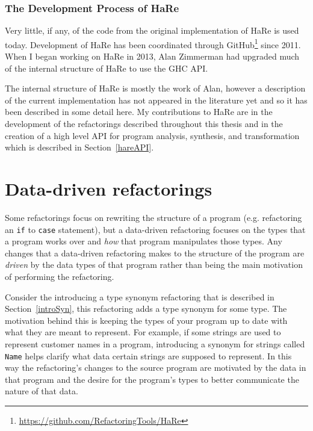 \subsection{The Development Process of HaRe}

Very little, if any, of the code from the original implementation of HaRe is used today. Development of HaRe has been coordinated through GitHub\footnote{\url{https://github.com/RefactoringTools/HaRe}} since 2011. When I began working on HaRe in 2013, Alan Zimmerman had upgraded much of the internal structure of HaRe to use the GHC API. 

The internal structure of HaRe is mostly the work of Alan, however a description of the current implementation has not appeared in the literature yet and so it has been described in some detail here. My contributions to HaRe are in the development of the refactorings described throughout this thesis and in the creation of a high level API for program analysis, synthesis, and transformation which is described in Section~\ref{hareAPI}.



\chapter{Data-driven refactorings}
\label{chp:ddRefs}

Some refactorings focus on rewriting the structure of a program (e.g. refactoring an \texttt{if} to \texttt{case} statement), but a data-driven refactoring focuses on the types that a program works over and \textit{how} that program manipulates those types. Any changes that a data-driven refactoring makes to the structure of the program are \textit{driven} by the data types of that program rather than being the main motivation of performing the refactoring. 

Consider the introducing a type synonym refactoring that is described in Section~\ref{introSyn}, this refactoring adds a type synonym for some type. The motivation behind this is keeping the types of your program up to date with what they are meant to represent. For example, if some strings are used to represent customer names in a program, introducing a synonym for strings called \texttt{Name} helps clarify what data certain strings are supposed to represent. In this way the refactoring's changes to the source program are motivated by the data in that program and the desire for the program's types to better communicate the nature of that data.


